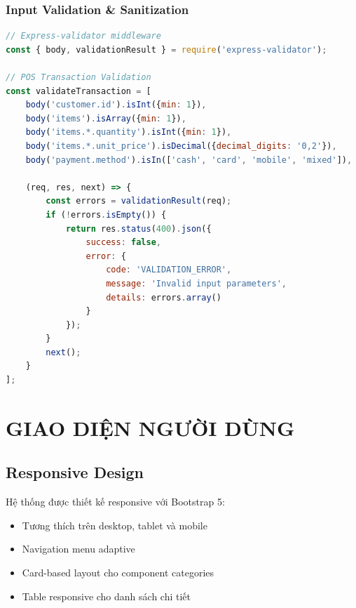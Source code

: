 \documentclass[12pt,a4paper]{article}
\begin{document}
\subsubsection{Input Validation \& Sanitization}
\begin{lstlisting}[language=javascript, caption=API Input Validation]
// Express-validator middleware
const { body, validationResult } = require('express-validator');

// POS Transaction Validation
const validateTransaction = [
    body('customer.id').isInt({min: 1}),
    body('items').isArray({min: 1}),
    body('items.*.quantity').isInt({min: 1}),
    body('items.*.unit_price').isDecimal({decimal_digits: '0,2'}),
    body('payment.method').isIn(['cash', 'card', 'mobile', 'mixed']),
    
    (req, res, next) => {
        const errors = validationResult(req);
        if (!errors.isEmpty()) {
            return res.status(400).json({
                success: false,
                error: {
                    code: 'VALIDATION_ERROR',
                    message: 'Invalid input parameters',
                    details: errors.array()
                }
            });
        }
        next();
    }
];
\end{lstlisting}

\section{GIAO DIỆN NGƯỜI DÙNG}

\subsection{Responsive Design}
Hệ thống được thiết kế responsive với Bootstrap 5:
\begin{itemize}
    \item Tương thích trên desktop, tablet và mobile
    \item Navigation menu adaptive
    \item Card-based layout cho component categories
    \item Table responsive cho danh sách chi tiết
\end{itemize}
\end{document}

